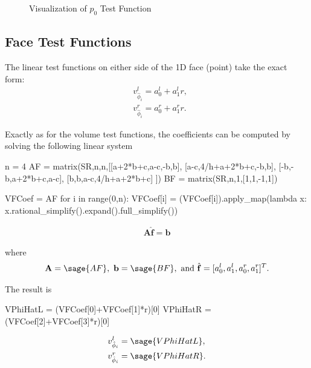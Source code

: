 \documentclass{article}
\numberwithin{equation}{section}
\newcommand{\vect}[1]{\mathbf{{#1}}}
\newcommand{\mat}[1]{\mathbf{{#1}}}
\begin{document}
\begin{figure}[!ht]
	\centering%
	\caption{Visualization of $p_0$ Test Function}
	\label{fig:test_vol_p0}
\end{figure}

\subsection{Face Test Functions}

The linear test functions on either side of the 1D face (point) take the exact form:
\begin{align}
& v_{\hat{\phi}_i}^l = a_0^l + a_1^l r,\\
& v_{\hat{\phi}_i}^r = a_0^r + a_1^r r.
\end{align}

Exactly as for the volume test functions, the coefficients can be computed by solving the following linear system

\begin{sagesilent}
n = 4
AF = matrix(SR,n,n,[[a+2*b+c,a-c,-b,b],
                    [a-c,4/h+a+2*b+c,-b,b],
                    [-b,-b,a+2*b+c,a-c],
                    [b,b,a-c,4/h+a+2*b+c]
                   ])
BF = matrix(SR,n,1,[1,1,-1,1])

VFCoef = AF\BF
for i in range(0,n):
    VFCoef[i] = (VFCoef[i]).apply_map(lambda x: x.rational_simplify().expand().full_simplify())
\end{sagesilent}

\begin{align}
\mat{A} \hat{\vect{f}} = \vect{b}
\end{align}

where
\begin{align}
\mat{A} = \sage{AF},\ \vect{b} = \sage{BF},\ \text{and}\ \hat{\vect{f}} = [a_0^l,a_1^l,a_0^r,a_1^r]^T.
\end{align}

The result is
\begin{sagesilent}
VPhiHatL = (VFCoef[0]+VFCoef[1]*r)[0]
VPhiHatR = (VFCoef[2]+VFCoef[3]*r)[0]
\end{sagesilent}

\begin{align}
& v_{\hat{\phi}_i}^l = \sage{VPhiHatL}, \\
& v_{\hat{\phi}_i}^r = \sage{VPhiHatR}.
\end{align}
\end{document}
